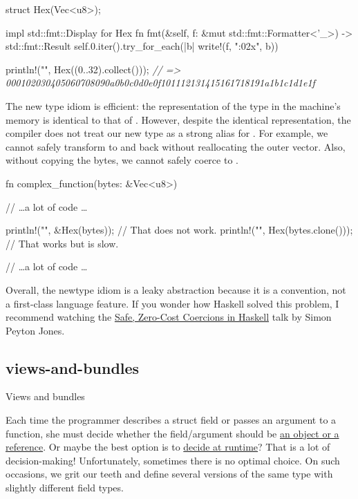 \documentclass{article}
\begin{document}
\begin{code}[rust]
struct Hex(Vec<u8>);

impl std::fmt::Display for Hex {
  fn fmt(&self, f: &mut std::fmt::Formatter<'_>) -> std::fmt::Result {
    self.0.iter().try_for_each(|b| write!(f, "{:02x}", b))
  }
}

println!("{}", Hex((0..32).collect()));
\emph{// => 000102030405060708090a0b0c0d0e0f101112131415161718191a1b1c1d1e1f}
\end{code}

The new type idiom is efficient: the representation of the  type in the machine's memory is identical to that of .
However, despite the identical representation, the compiler does not treat our new type as a strong alias for .
For example, we cannot safely transform  to  and back without reallocating the outer vector.
Also, without copying the bytes, we cannot safely coerce  to .

\begin{code}[rust]
fn complex_function(bytes: &Vec<u8>) {
  // \ldots  a lot of code \ldots

  println!("{}", &Hex(bytes));        // That does not work.
  println!("{}", Hex(bytes.clone())); // That works but is slow.

  // \ldots  a lot of code \ldots
}
\end{code}

Overall, the newtype idiom is a leaky abstraction because it is a convention, not a first-class language feature.
If you wonder how Haskell solved this problem, I recommend watching the \href{https://www.youtube.com/watch?v=iLZdN-R1JGk}{Safe, Zero-Cost Coercions in Haskell} talk by Simon Peyton Jones.

\subsection{views-and-bundles}{Views and bundles}

Each time the programmer describes a struct field or passes an argument to a function, she must decide whether the field/argument should be \href{#objects-values-references}{an object or a reference}.
Or maybe the best option is to \href{https://doc.rust-lang.org/std/borrow/enum.Cow.html}{decide at runtime}?
That is a lot of decision-making!
Unfortunately, sometimes there is no optimal choice.
On such occasions, we grit our teeth and define several versions of the same type with slightly different field types.
\end{document}
